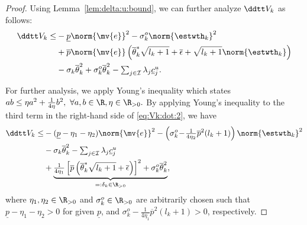 \documentclass[letterpaper, journal, twoside]{IEEEtran}
\begin{document}
\begin{proof}
Using Lemma~\ref{lem:delta:u:bound}, we can further analyze $\ddtt V_{k}$ as follows:
\begin{align} \label{eq:Vk:dot:2} 
  \ddtt V_{k}
  \le&
    -\underline{p}
    \norm{\mv{e}}^2
    -
    \sigma_k^o
    \norm{\estwth_k}^2
  \\ \nonumber
  &
    +
    \overline{p}
    \norm{\mv{e}}
    \left(
      \overline{\theta}^*_k
      \sqrt{l_{k}+1}
      +
      \overline{\epsilon}
      +
      \sqrt{l_k+1}\norm{\estwth_k}
    \right)        
  \\ \nonumber
  &
    -
    \sigma_k 
    \overline{\theta}_k^2
    +
    \sigma_k^o 
    \overline{\theta}_k^2
    -
    \textstyle\sum_{j\in\mathcal{I}}
    \lambda_j
    \underline{c}_j^u
    .
\end{align}

For further analysis, we apply Young's inequality which states 
$
  ab
  \le
  \eta a^2
  +
  \frac{1}{4\eta}b^2,
  \ 
  \forall a,b\in\R, \eta\in\R_{>0}
  .
$
By applying Young's inequality to the third term in the right-hand side of \eqref{eq:Vk:dot:2}, we have
\begin{align} \label{eq:Vk:dot:3} \nonumber
  \ddtt V_{k}
  \le &
    -(\underline{p}-\eta_1-\eta_2)
    \norm{\mv{e}}^2
    -
    \left(
      \sigma_k^o
      \!-\!
      \tfrac{1}{4\eta_2}
      \overline{p}^2
      (l_k+1)
    \right)
    \norm{\estwth_k}^2
  \\ 
  &
    -
    \sigma_k \overline{\theta}_k^2
    -
    \textstyle\sum_{j\in\mathcal{I}}
    \lambda_j
    \underline{c}_j^u
  \\ \nonumber
  &
      +
  \underbrace{
    \tfrac{1}{4\eta_1}
    \left[
    \overline{p}
      \left(
        \overline{\theta}_k^*
        \sqrt{l_{k}+1}
        +
        \overline{\epsilon}
      \right)
    \right]^2
    +
    \sigma_k^o
    \overline{\theta}_k^2
  }_{=: \delta_k \in \R_{>0}}
  ,
\end{align}
where $\eta_1,\eta_2\in\R_{>0}$ and $\sigma_k^o\in\R_{>0}$ are arbitrarily chosen such that $\underline{p}-\eta_1-\eta_2>0$ for given $\underline{p}$, and $\sigma_k^o - \frac{1}{4\eta_1} \overline{p}^2 (l_k+1) > 0$, respectively.


\end{proof}
\end{document}
